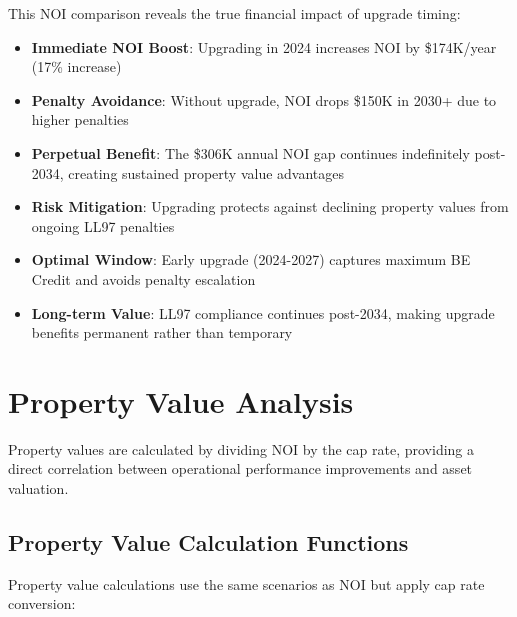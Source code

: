 \documentclass{article}
\begin{document}
\begin{center}
\end{center}

This NOI comparison reveals the true financial impact of upgrade timing:
\begin{itemize}
    \item \textbf{Immediate NOI Boost}: Upgrading in 2024 increases NOI by \$174K/year (17\% increase)
    \item \textbf{Penalty Avoidance}: Without upgrade, NOI drops \$150K in 2030+ due to higher penalties  
    \item \textbf{Perpetual Benefit}: The \$306K annual NOI gap continues indefinitely post-2034, creating sustained property value advantages
    \item \textbf{Risk Mitigation}: Upgrading protects against declining property values from ongoing LL97 penalties
    \item \textbf{Optimal Window}: Early upgrade (2024-2027) captures maximum BE Credit and avoids penalty escalation
    \item \textbf{Long-term Value}: LL97 compliance continues post-2034, making upgrade benefits permanent rather than temporary
\end{itemize}

\section{Property Value Analysis}

Property values are calculated by dividing NOI by the cap rate, providing a direct correlation between operational performance improvements and asset valuation.

\subsection{Property Value Calculation Functions}

Property value calculations use the same scenarios as NOI but apply cap rate conversion:
\end{document}
